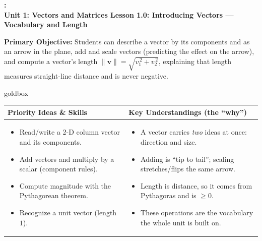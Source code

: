 \documentclass[10pt]{article}
\newcommand{\vv}{\mathbf{v}}
\newcommand{\UnitNumberName}{Unit 1: Vectors and Matrices \quad}
\newcommand{\LessonNumberName}{Lesson 1.0: Introducing Vectors --- Vocabulary and Length}
\begin{document}
\begin{center}
    {\Large\bfseries \CourseName: \SchoolYear \\
    {\small\bfseries \UnitNumberName \LessonNumberName}}
\end{center}

\begin{tcolorbox}[colback=blush, colframe=burgundy, boxrule=0.9pt, arc=2mm,
    left=2mm, right=2mm, top=1.5mm, bottom=1.5mm]
    \textbf{Primary Objective:} Students can describe a vector by its components and as an
    arrow in the plane, add and scale vectors (predicting the effect on the arrow), and
    compute a vector's length $\|\vv\|=\sqrt{v_1^{\,2}+v_2^{\,2}}$, explaining that length
    measures straight-line distance and is never negative.
\end{tcolorbox}

\renewcommand{\arraystretch}{1.4}
\begin{skillbox}{goldbox}
\begin{tabularx}{\linewidth}{@{}X|X@{}}
\textbf{Priority Ideas \& Skills} & \textbf{Key Understandings (the ``why'')} \\[2pt]
\hline
\vspace{-6pt}
\begin{itemize}[leftmargin=1.1em, nosep, after=\vspace{2pt}]
  \item Read/write a 2-D column vector and its components.
  \item Add vectors and multiply by a scalar (component rules).
  \item Compute magnitude with the Pythagorean theorem.
  \item Recognize a unit vector (length $1$).
\end{itemize}
&
\vspace{-6pt}
\begin{itemize}[leftmargin=1.1em, nosep, after=\vspace{2pt}]
  \item A vector carries \emph{two} ideas at once: direction and size.
  \item Adding is ``tip to tail''; scaling stretches/flips the same arrow.
  \item Length is distance, so it comes from Pythagoras and is $\ge 0$.
  \item These operations are the vocabulary the whole unit is built on.
\end{itemize}
\end{tabularx}
\end{skillbox}
\end{document}
